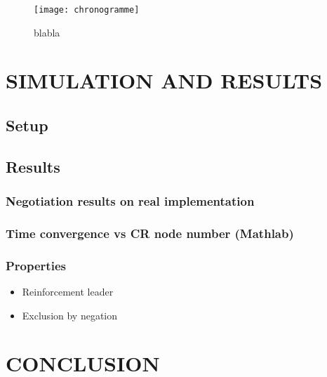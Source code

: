 \documentclass[conference]{IEEEtran}
\begin{document}
\begin{figure}[!h]
   \centering
   \texttt{[image: chronogramme]}\\
   \caption{\label{fig:chronogramme} blabla }
\end{figure}
 
\newpage
\section{SIMULATION AND RESULTS}
\label{sec:results}

\subsection{Setup}

\subsection{Results}

\subsubsection{Negotiation results on real implementation}

\subsubsection{Time convergence vs CR node number (Mathlab)}

\subsubsection{Properties}
\begin{itemize}
   \item Reinforcement leader
   \item Exclusion by negation
   
\end{itemize}

\section{CONCLUSION}









\end{document}
